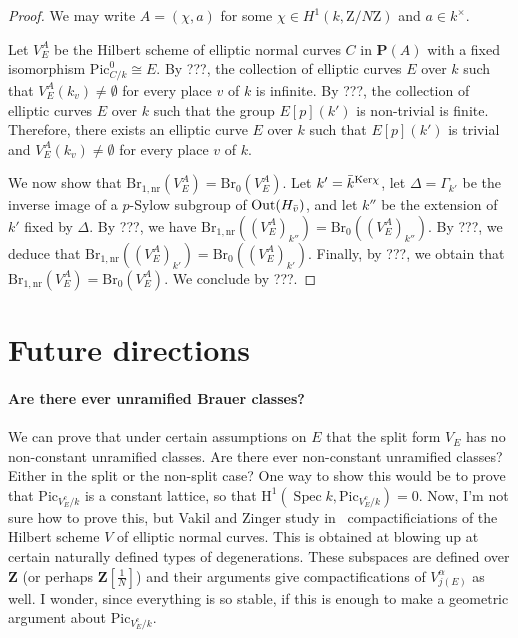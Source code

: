 \documentclass[10pt,letterpaper,twoside]{article}
\renewcommand{\H}{\mathrm{H}}
\newcommand{\Z}{\mathrm{Z}}
\renewcommand{\1}{\mathbf{1}}
\newcommand{\bP}{\mathbf{P}}
\newcommand{\bZ}{\mathbf{Z}}
\newcommand{\nr}{\mathrm{nr}}
\newcommand{\Pic}{\mathrm{Pic}}
\newcommand{\Br}{\mathrm{Br}}
\DeclareMathOperator{\Spec}{Spec}
\newcommand{\iso}{\cong}
\theoremstyle{plain}
\theoremstyle{plain}
\theoremstyle{definition}
\theoremstyle{named}
\theoremstyle{definition}
\begin{document}
	\begin{proof}
		We may write $A=(\chi,a)$ for some $\chi\in H^1(k,\Z/N\Z)$ and $a\in k^\times$. 
		
		Let $V_E^A$ be the Hilbert scheme of elliptic normal curves $C$ in $\bP(A)$ with a fixed isomorphism $\Pic_{C/k}^0\iso E$. By ???, the collection of elliptic curves $E$ over $k$ such that $V_E^A(k_v)\neq \emptyset$ for every place $v$ of $k$ is infinite. By ???, the collection of elliptic curves $E$ over $k$ such that the group $E[p](k')$ is non-trivial is finite. Therefore, there exists an elliptic curve $E$ over $k$ such that $E[p](k')$ is trivial and $V_E^A(k_v)\neq \emptyset$ for every place $v$ of $k$.
		
		We now show that $\Br_{1,\nr}(V_E^A)=\Br_0(V_E^A)$. Let $k'=\Bar{k}^{\mathrm{Ker}\chi}$, let $\Delta= \Gamma_{k'}$ be the inverse image of a $p$-Sylow subgroup of $\mathrm{Out}(H_{\Bar{v}})$, and let $k''$ be the extension of $k'$ fixed by $\Delta$. By ???, we have $\Br_{1,\nr}((V_E^A)_{k''})=\Br_0((V_E^A)_{k''})$. By ???, we deduce that $\Br_{1,\nr}((V_E^A)_{k'})=\Br_0((V_E^A)_{k'})$. Finally, by ???, we obtain that $\Br_{1,\nr}(V_E^A)=\Br_0(V_E^A)$. We conclude by ???.
	\end{proof}
	
	
	\section{Future directions}
	
	\paragraph{Are there ever unramified Brauer classes?} We can prove that under certain assumptions on
	$E$ that the split form $V_E$ has no non-constant unramified classes. Are there ever non-constant
	unramified classes? Either in the split or the non-split case? One way to show this would be to
	prove that $\Pic_{V^c_E/k}$ is a constant lattice, so that $\H^1(\Spec k,\Pic_{V^c_E/k})=0$. Now,
	I'm not sure how to prove this, but Vakil and Zinger study
	in~\cite{vakil-zinger,vakil-zinger-announce} compactificiations of the Hilbert scheme $V$ of elliptic normal
	curves. This is obtained at blowing up at certain naturally defined types of degenerations. These
	subspaces are defined over $\bZ$ (or perhaps $\bZ[\tfrac{1}{N}]$) and their arguments give
	compactifications of $V_{j(E)}^\alpha$ as well. I wonder, since everything is so stable, if this is
	enough to make a geometric argument about $\Pic_{V^c_E/k}$.
	
\end{document}
